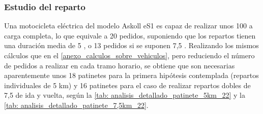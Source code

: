 \subsubsection{Estudio del reparto}
Una motocicleta eléctrica del modelo Askoll eS1 es capaz de realizar unos 100  a carga completa, lo que equivale a 20 pedidos, suponiendo que los repartos tienen una duración media de 5 , o 13 pedidos si se suponen 7,5 . Realizando los mismos cálculos que en el \autoref{anexo_calculos_sobre_vehiculos}, pero reduciendo el número de pedidos a realizar en cada tramo horario, se obtiene que son necesarias aparentemente unos 18 patinetes para la primera hipótesis contemplada (repartos individuales de 5 km) y 16 patinetes para el caso de realizar repartos dobles de 7,5  de ida y vuelta, según la \autoref{tab: analisis_detallado_patinete_5km_22} y la \autoref{tab: analisis_detallado_patinete_7,5km_22}.

